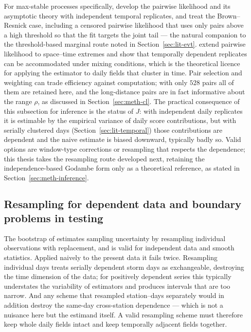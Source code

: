 For max-stable processes specifically, \citet{padoan2010} develop the pairwise likelihood and its asymptotic theory with independent temporal replicates, and \citet{huser2013} treat the Brown--Resnick case, including a censored pairwise likelihood that uses only pairs above a high threshold so that the fit targets the joint tail --- the natural companion to the threshold-based marginal route noted in Section~\ref{sec:lit-evt}. \citet{huserdavison2014} extend pairwise likelihood to space--time extremes and show that temporally dependent replicates can be accommodated under mixing conditions, which is the theoretical licence for applying the estimator to daily fields that cluster in time. Pair selection and weighting can trade efficiency against computation; with only \(528\) pairs all of them are retained here, and the long-distance pairs are in fact informative about the range \(\rho\), as discussed in Section~\ref{sec:meth-cl}. The practical consequence of this subsection for inference is the status of \(J\): with independent daily replicates it is estimable by the empirical variance of daily score contributions, but with serially clustered days (Section~\ref{sec:lit-temporal}) those contributions are dependent and the naive estimate is biased downward, typically badly so. Valid options are window-type corrections or resampling that respects the dependence; this thesis takes the resampling route developed next, retaining the independence-based Godambe form only as a theoretical reference, as stated in Section~\ref{sec:meth-inference}.

\subsection{Resampling for dependent data and boundary problems in testing}\label{sec:lit-inference}

The bootstrap of \citet{efron1979} estimates sampling uncertainty by resampling individual observations with replacement, and is valid for independent data and smooth statistics. Applied naively to the present data it fails twice. Resampling individual days treats serially dependent storm days as exchangeable, destroying the time dimension of the data; for positively dependent series this typically understates the variability of estimators and produces intervals that are too narrow. And any scheme that resampled station--days separately would in addition destroy the same-day cross-station dependence --- which is not a nuisance here but the estimand itself. A valid resampling scheme must therefore keep whole daily fields intact and keep temporally adjacent fields together.

